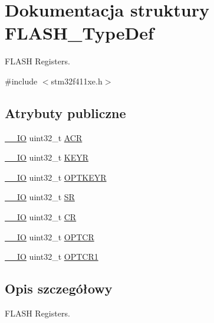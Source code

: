 \hypertarget{struct_f_l_a_s_h___type_def}{}\section{Dokumentacja struktury F\+L\+A\+S\+H\+\_\+\+Type\+Def}
\label{struct_f_l_a_s_h___type_def}


F\+L\+A\+SH Registers.  




{\ttfamily \#include $<$stm32f411xe.\+h$>$}

\subsection*{Atrybuty publiczne}
\begin{DoxyCompactItemize}
\item 
\hyperlink{core__sc300_8h_aec43007d9998a0a0e01faede4133d6be}{\+\_\+\+\_\+\+IO} uint32\+\_\+t \hyperlink{struct_f_l_a_s_h___type_def_aaf432a8a8948613f4f66fcace5d2e5fe}{A\+CR}
\item 
\hyperlink{core__sc300_8h_aec43007d9998a0a0e01faede4133d6be}{\+\_\+\+\_\+\+IO} uint32\+\_\+t \hyperlink{struct_f_l_a_s_h___type_def_a802e9a26a89b44decd2d32d97f729dd3}{K\+E\+YR}
\item 
\hyperlink{core__sc300_8h_aec43007d9998a0a0e01faede4133d6be}{\+\_\+\+\_\+\+IO} uint32\+\_\+t \hyperlink{struct_f_l_a_s_h___type_def_a793cd13a4636c9785fdb99316f7fd7ab}{O\+P\+T\+K\+E\+YR}
\item 
\hyperlink{core__sc300_8h_aec43007d9998a0a0e01faede4133d6be}{\+\_\+\+\_\+\+IO} uint32\+\_\+t \hyperlink{struct_f_l_a_s_h___type_def_a52c4943c64904227a559bf6f14ce4de6}{SR}
\item 
\hyperlink{core__sc300_8h_aec43007d9998a0a0e01faede4133d6be}{\+\_\+\+\_\+\+IO} uint32\+\_\+t \hyperlink{struct_f_l_a_s_h___type_def_a7919306d0e032a855200420a57f884d7}{CR}
\item 
\hyperlink{core__sc300_8h_aec43007d9998a0a0e01faede4133d6be}{\+\_\+\+\_\+\+IO} uint32\+\_\+t \hyperlink{struct_f_l_a_s_h___type_def_a54026c3b5bc2059f1b187acb6c4817ac}{O\+P\+T\+CR}
\item 
\hyperlink{core__sc300_8h_aec43007d9998a0a0e01faede4133d6be}{\+\_\+\+\_\+\+IO} uint32\+\_\+t \hyperlink{struct_f_l_a_s_h___type_def_a180354afdf5ff27d04befd794c46156d}{O\+P\+T\+C\+R1}
\end{DoxyCompactItemize}


\subsection{Opis szczegółowy}
F\+L\+A\+SH Registers. 


